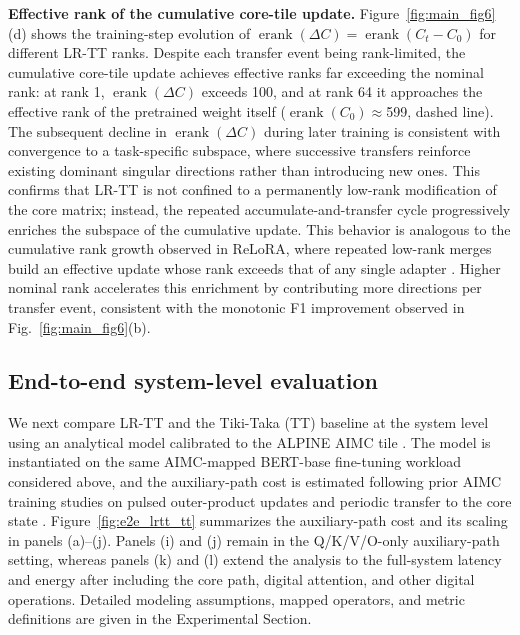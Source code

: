 \documentclass[AMA,LATO2COL]{WileyNJDv5}
\newcommand{\erank}{\operatorname{erank}}
\begin{document}
\noindent
\textbf{Effective rank of the cumulative core-tile update.}
Figure~\ref{fig:main_fig6}(d) shows the training-step evolution of \(\erank(\Delta C) = \erank(C_t - C_0)\) for different LR-TT ranks. Despite each transfer event being rank-limited, the cumulative core-tile update achieves effective ranks far exceeding the nominal rank: at rank 1, \(\erank(\Delta C)\) exceeds 100, and at rank 64 it approaches the effective rank of the pretrained weight itself (\(\erank(C_0)\approx\)599, dashed line). The subsequent decline in \(\erank(\Delta C)\) during later training is consistent with convergence to a task-specific subspace, where successive transfers reinforce existing dominant singular directions rather than introducing new ones. This confirms that LR-TT is not confined to a permanently low-rank modification of the core matrix; instead, the repeated accumulate-and-transfer cycle progressively enriches the subspace of the cumulative update. This behavior is analogous to the cumulative rank growth observed in ReLoRA, where repeated low-rank merges build an effective update whose rank exceeds that of any single adapter \cite{lialin2023relora}. Higher nominal rank accelerates this enrichment by contributing more directions per transfer event, consistent with the monotonic F1 improvement observed in Fig.~\ref{fig:main_fig6}(b).


\subsection{End-to-end system-level evaluation}
\label{subsec:PPA_transformer}

\noindent
We next compare LR-TT and the Tiki-Taka (TT) baseline at the system level using an analytical model calibrated to the ALPINE AIMC tile \cite{klein2023alpine}. The model is instantiated on the same AIMC-mapped BERT-base fine-tuning workload considered above, and the auxiliary-path cost is estimated following prior AIMC training studies on pulsed outer-product updates and periodic transfer to the core state \cite{gokmen2016rpu,gokmen2020tikitaka,gokmen2021ttv2,rasch2024fastrobust}. Figure~\ref{fig:e2e_lrtt_tt} summarizes the auxiliary-path cost and its scaling in panels (a)--(j). Panels (i) and (j) remain in the Q/K/V/O-only auxiliary-path setting, whereas panels (k) and (l) extend the analysis to the full-system latency and energy after including the core path, digital attention, and other digital operations. Detailed modeling assumptions, mapped operators, and metric definitions are given in the Experimental Section.
\end{document}
